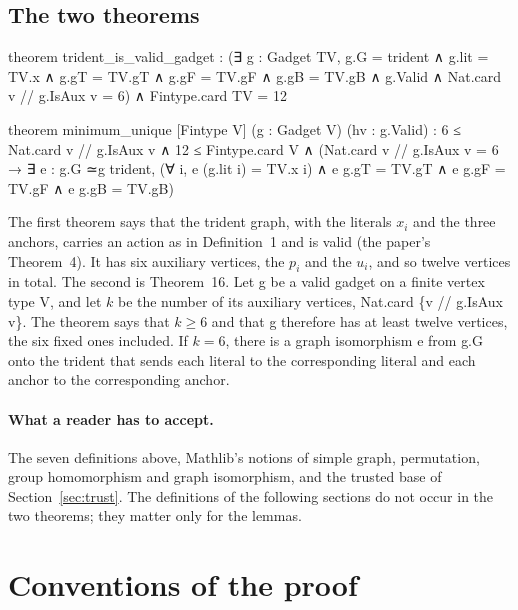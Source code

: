 \documentclass[11pt,a4paper]{article}
\newcommand{\leanus}{\textunderscore\allowbreak}
\newcommand{\lean}[1]{{\ttfamily\let\_\leanus #1}}
\begin{document}
\subsection{The two theorems}
\begin{code}
theorem trident_is_valid_gadget :
    (∃ g : Gadget TV, g.G = trident ∧ g.lit = TV.x ∧ g.gT = TV.gT ∧ g.gF = TV.gF ∧
      g.gB = TV.gB ∧ g.Valid ∧ Nat.card {v // g.IsAux v} = 6) ∧ Fintype.card TV = 12

theorem minimum_unique [Fintype V] (g : Gadget V) (hv : g.Valid) :
    6 ≤ Nat.card {v // g.IsAux v} ∧ 12 ≤ Fintype.card V ∧
    (Nat.card {v // g.IsAux v} = 6 → ∃ e : g.G ≃g trident,
      (∀ i, e (g.lit i) = TV.x i) ∧ e g.gT = TV.gT ∧ e g.gF = TV.gF ∧ e g.gB = TV.gB)
\end{code}
The first theorem says that the trident graph, with the literals $x_i$ and
the three anchors, carries an action as in Definition~1 and is valid (the
paper's Theorem~4). It has six auxiliary vertices, the $p_i$ and the $u_i$,
and so twelve vertices in total. The second is Theorem~16. Let \lean{g} be a
valid gadget on a finite vertex type \lean{V}, and let $k$ be the number of
its auxiliary vertices, \lean{Nat.card \{v // g.IsAux v\}}. The theorem says
that $k\ge6$ and that \lean{g} therefore has at least twelve vertices, the
six fixed ones included. If $k=6$, there is a graph isomorphism \lean{e}
from \lean{g.G} onto the trident that sends each literal to the corresponding
literal and each anchor to the corresponding anchor.

\paragraph{What a reader has to accept.} The seven definitions above,
Mathlib's notions of simple graph, permutation, group homomorphism and graph
isomorphism, and the trusted base of Section~\ref{sec:trust}. The
definitions of the following sections do not occur in the two theorems;
they matter only for the lemmas.

\section{Conventions of the proof}\label{sec:conventions}
\end{document}
